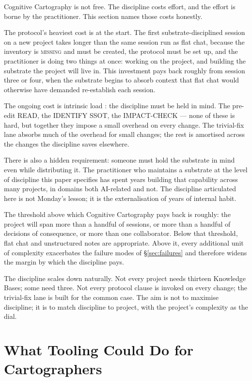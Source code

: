\documentclass[11pt,a4paper,twocolumn]{article}
\begin{document}
Cognitive Cartography is not free. The discipline costs effort,
and the effort is borne by the practitioner. This section names
those costs honestly.

The protocol's heaviest cost is at the start. The first
substrate-disciplined session on a new project takes longer than
the same session run as flat chat, because the inventory is
\textsc{missing} and must be created, the protocol must be set up,
and the practitioner is doing two things at once: working on the
project, and building the substrate the project will live in.
This investment pays back roughly from session three or four,
when the substrate begins to absorb context that flat chat would
otherwise have demanded re-establish each session.

The ongoing cost is intrinsic load \citep{sweller1988cognitive}:
the discipline must be held in mind. The pre-edit READ, the
IDENTIFY SSOT, the IMPACT-CHECK --- none of these is hard, but
together they impose a small overhead on every change. The
trivial-fix lane absorbs much of the overhead for small changes;
the rest is amortised across the changes the discipline saves
elsewhere.

There is also a hidden requirement: someone must hold the substrate
in mind even while distributing it. The practitioner who maintains
a substrate at the level of discipline this paper specifies has
spent years building that capability across many projects, in
domains both AI-related and not. The discipline articulated here is
not Monday's lesson; it is the externalisation of years of internal
habit.

The threshold above which Cognitive Cartography pays back is
roughly: the project will span more than a handful of sessions,
or more than a handful of decisions of consequence, or more than
one collaborator. Below that threshold, flat chat and unstructured
notes are appropriate. Above it, every additional unit of
complexity exacerbates the failure modes of \S\ref{sec:failures}
and therefore widens the margin by which the discipline pays.

The discipline scales down naturally. Not every project needs
thirteen Knowledge Bases; some need three. Not every protocol
clause is invoked on every change; the trivial-fix lane is built
for the common case. The aim is not to maximise discipline; it is
to match discipline to project, with the project's complexity as
the dial.

\section{What Tooling Could Do for Cartographers}
\label{sec:tooling}
\end{document}
